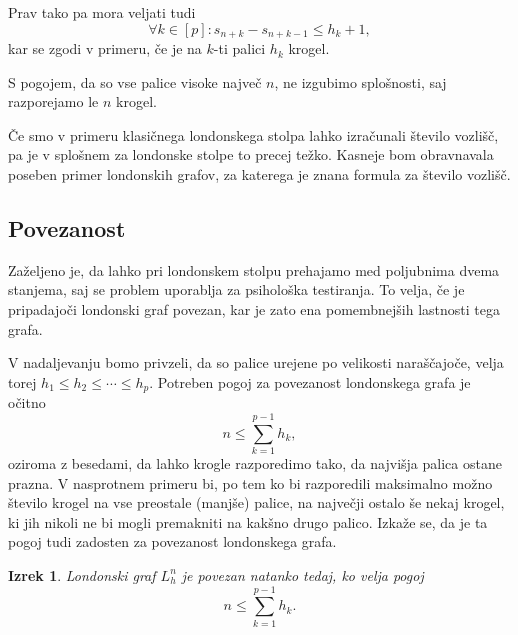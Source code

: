 \documentclass[11pt,a4paper]{article}
\theoremstyle{definition} %
\theoremstyle{plain} %
\newtheorem{izrek}[definicija]{Izrek}
\begin{document}
Prav tako pa mora veljati tudi 
\[\forall k \in [p]\colon s_{n+k} - s_{n+k-1} \leq h_k + 1,\]
kar se zgodi v primeru, če je na $k$-ti palici $h_k$ krogel.

S pogojem, da so vse palice visoke največ $n$, ne izgubimo splošnosti, saj razporejamo le $n$ krogel.

Če smo v primeru klasičnega londonskega stolpa lahko izračunali število vozlišč, pa je v splošnem za londonske stolpe to precej težko. Kasneje bom obravnavala poseben primer londonskih grafov, za katerega je znana formula za število vozlišč. 

\subsection{Povezanost}
Zaželjeno je, da lahko pri londonskem stolpu prehajamo med poljubnima dvema stanjema, saj se problem uporablja za psihološka testiranja. To velja, če je pripadajoči londonski graf povezan, kar je zato ena pomembnejših lastnosti tega grafa.

V nadaljevanju bomo privzeli, da so palice urejene po velikosti naraščajoče, velja torej $h_1 \leq h_2 \leq \cdots \leq h_p$.
Potreben pogoj za povezanost londonskega grafa je očitno 
\[ n \leq \sum_{k=1}^{p-1} h_k, \]
oziroma z besedami, da lahko krogle razporedimo tako, da najvišja palica ostane prazna. V nasprotnem primeru bi, po tem ko bi razporedili maksimalno možno število krogel na vse preostale (manjše) palice, na največji ostalo še nekaj krogel, ki jih nikoli ne bi mogli premakniti na kakšno drugo palico.
Izkaže se, da je ta pogoj tudi zadosten za povezanost londonskega grafa.

\begin{izrek}
    Londonski graf $L_h^n$ je povezan natanko tedaj, ko velja pogoj
    \begin{equation}
        n \leq \sum_{k=1}^{p-1} h_k.
        \label{eq:pogoj-povezanosti}
    \end{equation}
\end{izrek}
\end{document}
